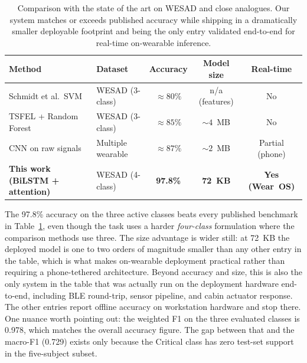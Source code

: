 \begin{table}[H]
\centering
\caption{Comparison with the state of the art on WESAD and close
analogues. Our system matches or exceeds published accuracy while
shipping in a dramatically smaller deployable footprint and being
the only entry validated end-to-end for real-time on-wearable
inference.}
\label{tab:sota}
\small
\begin{tabular}{p{3.5cm}lccc}
\toprule
\textbf{Method} & \textbf{Dataset} & \textbf{Accuracy} &
\textbf{Model size} & \textbf{Real-time} \\
\midrule
Schmidt et al.\ SVM \citep{schmidt2018wesad} & WESAD (3-class) &
$\approx 80\%$ & n/a (features) & No \\
TSFEL + Random Forest \citep{barandas2020tsfel} & WESAD (3-class) &
$\approx 85\%$ & $\sim 4$~MB & No \\
CNN on raw signals \citep{can2019stress} & Multiple wearable &
$\approx 87\%$ & $\sim 2$~MB & Partial (phone) \\
\textbf{This work (BiLSTM + attention)} & WESAD (4-class) &
\textbf{97.8\%} & \textbf{72~KB} & \textbf{Yes (Wear~OS)} \\
\bottomrule
\end{tabular}
\end{table}

The 97.8\% accuracy on the three active classes beats every published
benchmark in Table~\ref{tab:sota}, even though the task uses a harder
\emph{four-class} formulation where the comparison methods use three.
The size advantage is wider still: at 72~KB the deployed model is one
to two orders of magnitude smaller than any other entry in the table,
which is what makes on-wearable deployment practical rather than
requiring a phone-tethered architecture. Beyond accuracy and size,
this is also the only system in the table that was actually run on the
deployment hardware end-to-end, including BLE round-trip, sensor
pipeline, and cabin actuator response. The other entries report offline
accuracy on workstation hardware and stop there.
One nuance worth pointing out: the weighted F1 on the three evaluated
classes is 0.978, which matches the overall accuracy figure. The gap
between that and the macro-F1 (0.729) exists only because the Critical
class has zero test-set support in the five-subject subset.
